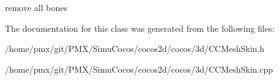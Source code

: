 remove all bones 

The documentation for this class was generated from the following files\+:\begin{DoxyCompactItemize}
\item 
/home/pmx/git/\+P\+M\+X/\+Simu\+Cocos/cocos2d/cocos/3d/C\+C\+Mesh\+Skin.\+h\item 
/home/pmx/git/\+P\+M\+X/\+Simu\+Cocos/cocos2d/cocos/3d/C\+C\+Mesh\+Skin.\+cpp\end{DoxyCompactItemize}
